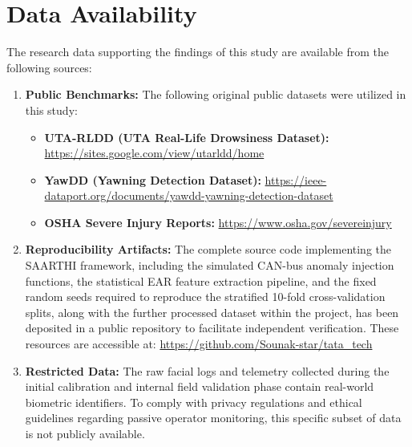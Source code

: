 
\section{Data Availability}
The research data supporting the findings of this study are available from the following sources:
\begin{enumerate}
    \item \textbf{Public Benchmarks:} The following original public datasets were utilized in this study:
    \begin{itemize}
        \item \textbf{UTA-RLDD (UTA Real-Life Drowsiness Dataset):} \url{https://sites.google.com/view/utarldd/home}
        \item \textbf{YawDD (Yawning Detection Dataset):} \url{https://ieee-dataport.org/documents/yawdd-yawning-detection-dataset}
        \item \textbf{OSHA Severe Injury Reports:} \url{https://www.osha.gov/severeinjury}
    \end{itemize}
    \item \textbf{Reproducibility Artifacts:} The complete source code implementing the SAARTHI framework, including the simulated CAN-bus anomaly injection functions, the statistical EAR feature extraction pipeline, and the fixed random seeds required to reproduce the stratified 10-fold cross-validation splits, along with the further processed dataset within the project, has been deposited in a public repository to facilitate independent verification. These resources are accessible at: \def\UrlFont{\bfseries}\url{https://github.com/Sounak-star/tata_tech}
    \item \textbf{Restricted Data:} The raw facial logs and telemetry collected during the initial calibration and internal field validation phase contain real-world biometric identifiers. To comply with privacy regulations and ethical guidelines regarding passive operator monitoring, this specific subset of data is not publicly available.
\end{enumerate}
